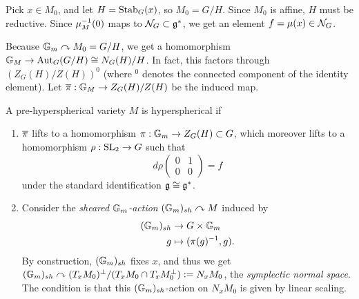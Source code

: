 \documentclass{article}
\begin{document}
Pick $x \in M_0$, and let $H = \operatorname{Stab}_G(x)$, so $M_0 = G / H$.
Since $M_0$ is affine, $H$ must be reductive.
Since $\mu_M^{-1}(0)$ maps to $\mathcal{N}_G \subset \mathfrak{g}^*$, we get an element $f = \mu(x) \in \mathcal{N}_G$.

Because $\mathbb{G}_m \curvearrowright M_0 = G / H$, we get a homomorphism $\mathbb{G}_M \to \operatorname{Aut}_G(G / H) \cong N_G(H) / H$.
In fact, this factors through $(Z_G(H) / Z(H))^0$ (where ${}^0$ denotes the connected component of the identity element).
Let $\overline{\pi}: \mathbb{G}_M \to Z_G(H) / Z(H)$ be the induced map.

\begin{dfn}
	A pre-hyperspherical variety $M$ is hyperspherical if
	\begin{enumerate}
		\item $\overline{\pi}$ lifts to a homomorphism $\pi: \mathbb{G}_m \to Z_G(H) \subset G$, which moreover lifts to a homomorphism $\rho: \operatorname{SL}_2 \to G$ such that
			\[
				d\rho \begin{pmatrix}
					0 & 1 \\
					0 & 0
				\end{pmatrix} = f
			\]
			under the standard identification $\mathfrak{g} \cong \mathfrak{g}^*$.
		\item Consider the \emph{sheared $\mathbb{G}_m$-action} $(\mathbb{G}_m)_{sh} \curvearrowright M$ induced by
			\begin{align*}
				(\mathbb{G}_m)_{sh} &\to G \times \mathbb{G}_m \\
				g &\mapsto (\pi(g)^{-1}, g).
			\end{align*}
			By construction, $(\mathbb{G}_m)_{sh}$ fixes $x$, and thus we get $(\mathbb{G}_m)_{sh} \curvearrowright (T_x M_0)^\perp / (T_x M_0 \cap T_x M_0^\perp) := N_x M_0$, the \emph{symplectic normal space}.
			The condition is that this $(\mathbb{G}_m)_{sh}$-action on $N_x M_0$ is given by linear scaling.
	\end{enumerate}
\end{dfn}
\end{document}
